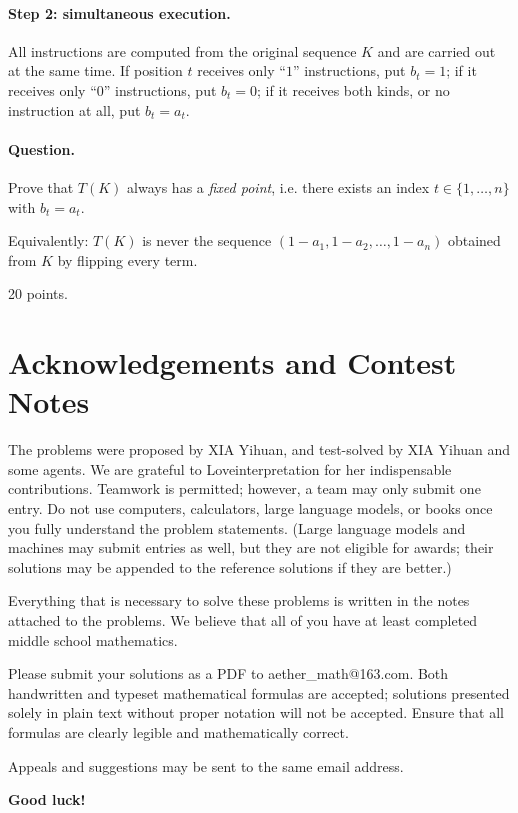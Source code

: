\documentclass{article}
\begin{document}
\paragraph{Step 2: simultaneous execution.}
All instructions are computed from the original sequence $K$ and are carried
out at the same time. If position $t$ receives only ``$1$'' instructions, put
$b_t=1$; if it receives only ``$0$'' instructions, put $b_t=0$; if it
receives both kinds, or no instruction at all, put $b_t=a_t$.

\paragraph{Question.}
Prove that $T(K)$ always has a \emph{fixed point}, i.e. there exists an index
$t\in\{1,\ldots ,n\}$ with $b_t=a_t$.

Equivalently: $T(K)$ is never the sequence $(1-a_1,1-a_2,\ldots ,1-a_n)$
obtained from $K$ by flipping every term.

20 points.

\section{Acknowledgements and Contest Notes}

The problems were proposed by XIA Yihuan, and test-solved by XIA Yihuan and some agents. 
We are grateful to Loveinterpretation for her indispensable contributions.
Teamwork is permitted; however, a team may only submit one entry. Do not use computers, calculators, large language models, or books once you fully understand the problem statements. (Large language models and machines may submit entries as well, but they are not eligible for awards; their solutions may be appended to the reference solutions if they are better.)

Everything that is necessary to solve these problems is written in the notes attached to the problems. We believe that all of you have at least completed middle school mathematics.

Please submit your solutions as a PDF to aether\_math@163.com. Both handwritten and typeset mathematical formulas are accepted; solutions presented solely in plain text without proper notation will not be accepted. Ensure that all formulas are clearly legible and mathematically correct.

Appeals and suggestions may be sent to the same email address.

\vspace{1em}
\noindent \textbf{Good luck!}
\end{document}
